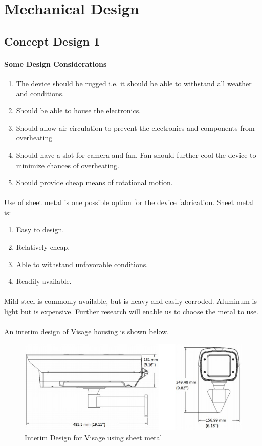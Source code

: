 \section{Mechanical Design}
\subsection{Concept Design 1}
\paragraph{Some Design Considerations}
\begin{enumerate}
\item The device should be rugged i.e. it should be able to withstand all weather and conditions.
\item Should be able to house the electronics.
\item Should allow air circulation to prevent the electronics and components from overheating
\item Should have a slot for camera and fan. Fan should further cool the device to minimize chances of overheating.
\item Should provide cheap means of rotational motion.
\end{enumerate}
\paragraph{}Use of sheet metal is one possible option for the device fabrication. Sheet metal is:
\begin{enumerate}
\item Easy to design.
\item Relatively cheap.
\item Able to withstand unfavorable conditions.
\item Readily available.
\end{enumerate} 
\paragraph{}Mild steel is commonly available, but is heavy and easily corroded. Aluminum is light but is expensive. Further research will enable us to choose the metal to use.
\paragraph{} An interim design of Visage housing is shown below.
\begin{center}
\begin{figure}[!h]
\centering
\includegraphics{Figures/Visage}
\caption{Interim Design for Visage using sheet metal}
\end{figure}
\end{center}
\clearpage
